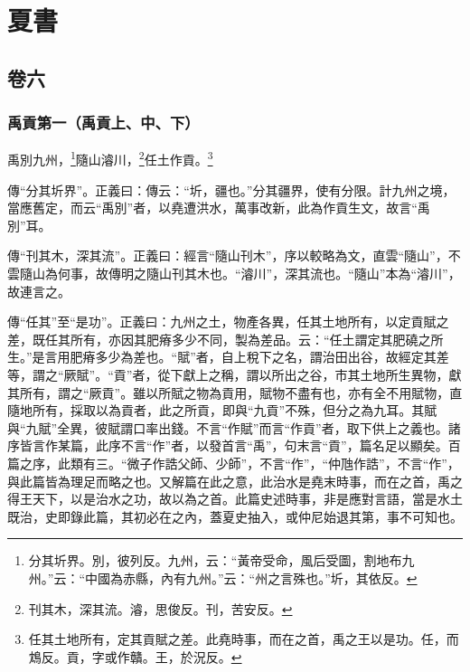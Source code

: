 

\part{夏書}


\chapter{卷六}


\section{禹貢第一（禹貢上、中、下）}

禹別九州，\footnote{分其圻界。別，彼列反。九州，云：“黃帝受命，風后受圖，割地布九州。”云：“中國為赤縣，內有九州。”云：“州之言殊也。”圻，其依反。}隨山濬川，\footnote{刊其木，深其流。濬，思俊反。刊，苦安反。}任土作貢。\footnote{任其土地所有，定其貢賦之差。此堯時事，而在之首，禹之王以是功。任，而鴆反。貢，字或作贛。王，於況反。}

{\noindent\zhuan{}\fzbyks 傳“分其圻界”。正義曰：傳云：“圻，疆也。”分其疆界，使有分限。計九州之境，當應舊定，而云“禹別”者，以堯遭洪水，萬事改新，此為作貢生文，故言“禹別”耳。 \par}

{\noindent\zhuan{}\fzbyks 傳“刊其木，深其流”。正義曰：經言“隨山刊木”，序以較略為文，直雲“隨山”，不雲隨山為何事，故傳明之隨山刊其木也。“濬川”，深其流也。“隨山”本為“濬川”，故連言之。 \par}

{\noindent\zhuan{}\fzbyks 傳“任其”至“是功”。正義曰：九州之土，物產各異，任其土地所有，以定貢賦之差，既任其所有，亦因其肥瘠多少不同，製為差品。云：“任土謂定其肥磽之所生。”是言用肥瘠多少為差也。“賦”者，自上稅下之名，謂治田出谷，故經定其差等，謂之“厥賦”。“貢”者，從下獻上之稱，謂以所出之谷，市其土地所生異物，獻其所有，謂之“厥貢”。雖以所賦之物為貢用，賦物不盡有也，亦有全不用賦物，直隨地所有，採取以為貢者，此之所貢，即與“九貢”不殊，但分之為九耳。其賦與“九賦”全異，彼賦謂口率出錢。不言“作賦”而言“作貢”者，取下供上之義也。諸序皆言作某篇，此序不言“作”者，以發首言“禹”，句末言“貢”，篇名足以顯矣。百篇之序，此類有三。“微子作誥父師、少師”，不言“作”，“仲虺作誥”，不言“作”，與此篇皆為理足而略之也。又解篇在此之意，此治水是堯末時事，而在之首，禹之得王天下，以是治水之功，故以為之首。此篇史述時事，非是應對言語，當是水土既治，史即錄此篇，其初必在之內，蓋夏史抽入，或仲尼始退其第，事不可知也。 \par}

